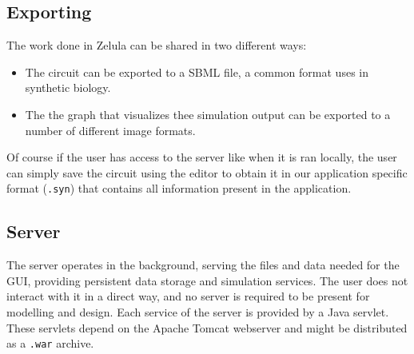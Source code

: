 \subsection{Exporting}
The work done in Zelula can be shared in two different ways:
\begin{itemize}
	\item The circuit can be exported to a SBML file, a common format uses in synthetic biology.
	\item The the graph that visualizes thee simulation output can be exported to a number of different image formats.
\end{itemize}

Of course if the user has access to the server like when it is ran locally, the user can simply save the circuit using the editor to obtain it in our application specific format (\verb=.syn=) that contains all information present in the application.

\subsection{Server}
The server operates in the background, serving the files and data needed for the GUI, providing persistent data storage and simulation services. The user does not interact with it in a direct way, and no server is required to be present for modelling and design. Each service of the server is provided by a Java servlet. These servlets depend on the Apache Tomcat webserver and might be distributed as a \verb|.war| archive. 
